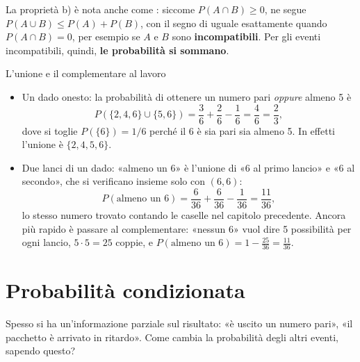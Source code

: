 La proprietà b) è nota anche come : siccome $P(A \cap B) \geq 0$, ne segue
$P(A \cup B) \leq P(A) + P(B)$, con il segno di uguale esattamente quando $P(A \cap B) = 0$, per esempio se $A$ e
$B$ sono \textbf{incompatibili}. Per gli eventi incompatibili, quindi, \textbf{le probabilità si sommano}.

\begin{esempio}{L'unione e il complementare al lavoro}
\begin{itemize}
  \item Un dado onesto: la probabilità di ottenere un numero pari \emph{oppure} almeno 5 è
        \[ P(\{2,4,6\} \cup \{5,6\}) = \frac{3}{6} + \frac{2}{6} - \frac{1}{6} = \frac{4}{6} = \frac{2}{3} , \]
        dove si toglie $P(\{6\}) = 1/6$ perché il 6 è sia pari sia almeno 5. In effetti l'unione è $\{2, 4, 5, 6\}$.
  \item Due lanci di un dado: «almeno un 6» è l'unione di «6 al primo lancio» e «6 al secondo», che si verificano
        insieme solo con $(6,6)$:
        \[ P(\text{almeno un 6}) = \frac{6}{36} + \frac{6}{36} - \frac{1}{36} = \frac{11}{36} , \]
        lo stesso numero trovato contando le caselle nel capitolo precedente. Ancora più rapido è passare al
        complementare: «nessun 6» vuol dire 5 possibilità per ogni lancio, $5 \cdot 5 = 25$ coppie, e
        $P(\text{almeno un 6}) = 1 - \frac{25}{36} = \frac{11}{36}$.
\end{itemize}
\end{esempio}


\section{Probabilità condizionata}

Spesso si ha un'informazione parziale sul risultato: «è uscito un numero pari», «il pacchetto è arrivato in
ritardo». Come cambia la probabilità degli altri eventi, sapendo questo?

